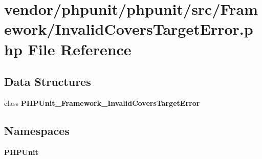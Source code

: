 \section{vendor/phpunit/phpunit/src/\+Framework/\+Invalid\+Covers\+Target\+Error.php File Reference}
\label{_invalid_covers_target_error_8php}
\subsection*{Data Structures}
\begin{DoxyCompactItemize}
\item 
class {\bf P\+H\+P\+Unit\+\_\+\+Framework\+\_\+\+Invalid\+Covers\+Target\+Error}
\end{DoxyCompactItemize}
\subsection*{Namespaces}
\begin{DoxyCompactItemize}
\item 
 {\bf P\+H\+P\+Unit}
\end{DoxyCompactItemize}
